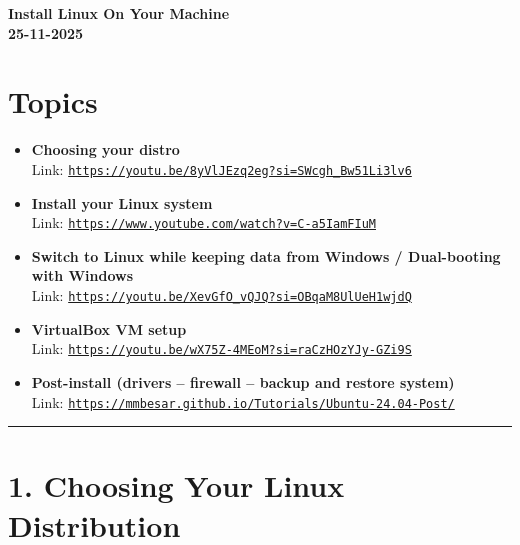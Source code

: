 \documentclass[12pt]{article}
\newcommand{\courseTitle}{Install Linux On Your Machine}
\newcommand{\courseDate}{25-11-2025}
\begin{document}
\begin{center}
\headingfont\Huge\bfseries\color{navy}
\courseTitle\\[0.5em]
\Large\color{teamred}
\courseDate
\end{center}

\section*{Topics}

\begin{itemize}
    \item \textbf{Choosing your distro}
          \\Link: \href{https://youtu.be/8yVlJEzq2eg?si=SWcgh_Bw51Li3lv6}{\texttt{https://youtu.be/8yVlJEzq2eg?si=SWcgh\_Bw51Li3lv6}}
    
    \item \textbf{Install your Linux system}
          \\Link: \href{https://www.youtube.com/watch?v=C-a5IamFIuM}{\texttt{https://www.youtube.com/watch?v=C-a5IamFIuM}}
    
    \item \textbf{Switch to Linux while keeping data from Windows / Dual-booting with Windows}
          \\Link: \href{https://youtu.be/XevGfO_vQJQ?si=OBqaM8UlUeH1wjdQ}{\texttt{https://youtu.be/XevGfO\_vQJQ?si=OBqaM8UlUeH1wjdQ}}
    
    \item \textbf{VirtualBox VM setup}
          \\Link: \href{https://youtu.be/wX75Z-4MEoM?si=raCzHOzYJy-GZi9S}{\texttt{https://youtu.be/wX75Z-4MEoM?si=raCzHOzYJy-GZi9S}}
    
    \item \textbf{Post-install (drivers – firewall – backup and restore system)}
          \\Link: \href{https://mmbesar.github.io/Tutorials/Ubuntu-24.04-Post/}{\texttt{https://mmbesar.github.io/Tutorials/Ubuntu-24.04-Post/}}
\end{itemize}

\vspace{1em}
\begin{center}
\color{teamred}\rule{0.8\textwidth}{1pt}
\end{center}

\section*{1. Choosing Your Linux Distribution}
\end{document}
